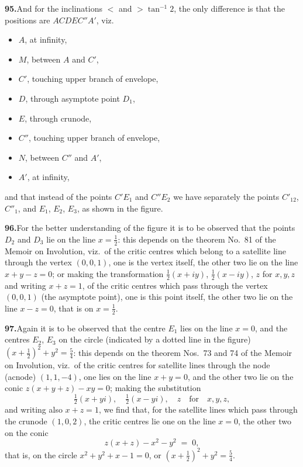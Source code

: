 \documentclass[11pt]{article}
\begin{document}
\medskip
\textbf{95.}\quad And for the inclinations $<$ and $> \tan^{-1} 2$, the only difference is that the positions are $A C D E C'' A'$, viz.
\begin{itemize}\itemsep0pt
\item $A$, at infinity,
\item $M$, between $A$ and $C'$,
\item $C'$, touching upper branch of envelope,
\item $D$, through asymptote point $D_{1}$,
\item $E$, through crunode,
\item $C''$, touching upper branch of envelope,
\item $N$, between $C''$ and $A'$,
\item $A'$, at infinity,
\end{itemize}
and that instead of the points $C'E_{1}$ and $C''E_{2}$ we have separately the points $C'_{12}$, $C''_{1}$, and $E_{1}$, $E_{2}$, $E_{3}$, as shown in the figure.

\medskip
\textbf{96.}\quad For the better understanding of the figure it is to be observed that the points $D_{2}$ and $D_{3}$ lie on the line $x = \tfrac{1}{2}$: this depends on the theorem No.~81 of the Memoir on Involution, viz.\ of the critic centres which belong to a satellite line through the vertex $(0, 0, 1)$, one is the vertex itself, the other two lie on the line $x + y - z = 0$; or making the transformation $\tfrac{1}{2}(x + iy)$, $\tfrac{1}{2}(x - iy)$, $z$ for $x, y, z$ and writing $x + z = 1$, of the critic centres which pass through the vertex $(0, 0, 1)$ (the asymptote point), one is this point itself, the other two lie on the line $x - z = 0$, that is on $x = \tfrac{1}{2}$.

\medskip
\textbf{97.}\quad Again it is to be observed that the centre $E_{1}$ lies on the line $x = 0$, and the centres $E_{2}$, $E_{3}$ on the circle (indicated by a dotted line in the figure) $(x + \tfrac{1}{2})^{2} + y^{2} = \tfrac{5}{4}$: this depends on the theorem Nos.~73 and 74 of the Memoir on Involution, viz.\ of the critic centres for satellite lines through the node (acnode) $(1, 1, -4)$, one lies on the line $x + y = 0$, and the other two lie on the conic $z(x + y + z) - xy = 0$; making the substitution
\[
\tfrac{1}{2}(x + yi),\quad \tfrac{1}{2}(x - yi),\quad z\quad\text{for}\quad x, y, z,
\]
and writing also $x + z = 1$, we find that, for the satellite lines which pass through the crunode $(1, 0, 2)$, the critic centres lie one on the line $x = 0$, the other two on the conic
\[
z(x + z) - x^{2} - y^{2} \;=\; 0,
\]
that is, on the circle $x^{2} + y^{2} + x - 1 = 0$, or $(x + \tfrac{1}{2})^{2} + y^{2} = \tfrac{5}{4}$.
\end{document}
